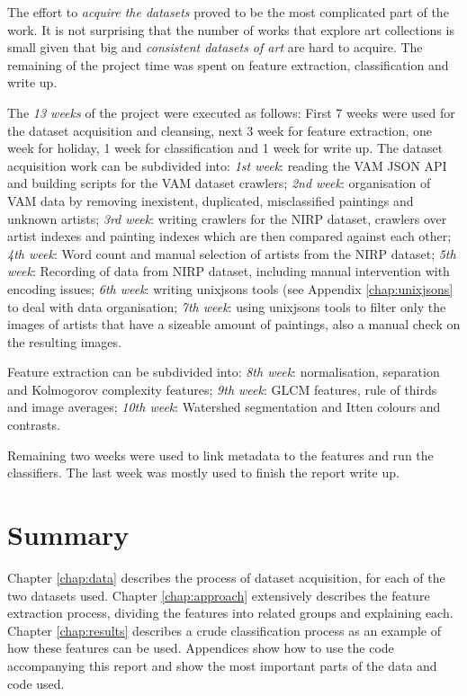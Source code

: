 \documentclass[11pt,a4paper,twoside,openright]{report}
\begin{document}
The effort to \emph{acquire the datasets} proved to be the most complicated
part of the work.  It is not surprising that the number of works that explore
art collections is small given that big and \emph{consistent datasets of art}
are hard to acquire.  The remaining of the project time was spent on feature
extraction, classification and write up.

The \emph{13 weeks} of the project were executed as follows: First 7 weeks were
used for the dataset acquisition and cleansing, next 3 week for feature
extraction, one week for holiday, 1 week for classification and 1 week for
write up.  The dataset acquisition work can be subdivided into: \emph{1st
week}: reading the VAM JSON API and building scripts for the VAM dataset
crawlers; \emph{2nd week}: organisation of VAM data by removing inexistent,
duplicated, misclassified paintings and unknown artists;  \emph{3rd week}:
writing crawlers for the NIRP dataset, crawlers over artist indexes and
painting indexes which are then compared against each other;  \emph{4th week}:
Word count and manual selection of artists from the NIRP dataset;  \emph{5th
week}: Recording of data from NIRP dataset, including manual intervention with
encoding issues;  \emph{6th week}: writing unixjsons tools (see Appendix
\ref{chap:unixjsons} to deal with data organisation;  \emph{7th week}: using
unixjsons tools to filter only the images of artists that have a sizeable
amount of paintings, also a manual check on the resulting images.

Feature extraction can be subdivided into: \emph{8th week}: normalisation,
separation and Kolmogorov complexity features;  \emph{9th week}: GLCM features,
rule of thirds and image averages; \emph{10th week}: Watershed segmentation and
Itten colours and contrasts.

Remaining two weeks were used to link metadata to the features and run the
classifiers.  The last week was mostly used to finish the report write up.

\section{Summary}

Chapter \ref{chap:data} describes the process of dataset acquisition, for each
of the two datasets used.  Chapter \ref{chap:approach} extensively describes
the feature extraction process, dividing the features into related groups and
explaining each.  Chapter \ref{chap:results} describes a crude classification
process as an example of how these features can be used.  Appendices show how
to use the code accompanying this report and show the most important parts of
the data and code used.
\end{document}
